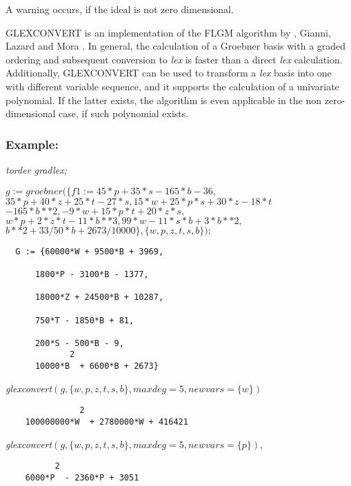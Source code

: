 A warning occurs, if the ideal is not zero dimensional.

GLEXCONVERT is an implementation of the FLGM algorithm by
, {\sc Gianni}, {\sc Lazard} and {\sc
Mora} \cite{FGLM}. In general, the calculation of a Groebner basis
with a graded ordering and subsequent conversion to {\it lex} is
faster than a direct {\it lex} calculation. Additionally, GLEXCONVERT
can be used to transform a {\it lex} basis into one with different
variable sequence, and it supports the calculation of a univariate
polynomial. If the latter exists, the algorithm is even applicable in
the non zero-dimensional case, if such polynomial exists.

\subsubsection*{Example:}
{\it torder gradlex;}

$ g  :=  groebner  (\{ f1 := 45*p + 35*s -165*b -36,$ \\
\hspace*{+1cm} $35*p + 40*z + 25*t - 27*s, 15*w + 25*p*s +30*z -18*t $ \\
\hspace*{+1cm} $-165*b**2, -9*w + 15*p*t  + 20*z*s, $ \\
\hspace*{+1cm} $ w*p + 2*z*t - 11*b**3, 99*w - 11*s*b +3*b**2, $ \\
\hspace*{+1cm} $ b**2 + 33/50*b + 2673/10000\}, \{w,p,z,t,s,b\});$

\begin{verbatim}
  G := {60000*W + 9500*B + 3969,

      1800*P - 3100*B - 1377,

      18000*Z + 24500*B + 10287,

      750*T - 1850*B + 81,

      200*S - 500*B - 9,
             2
      10000*B  + 6600*B + 2673}
\end{verbatim}

{\it
glexconvert}$\left(g,\{w,p,z,t,s,b\},maxdeg=5,newvars=\{w\}\right)$
\begin{verbatim}
               2
    100000000*W  + 2780000*W + 416421
\end{verbatim}

{\it glexconvert}$\left(g,\{w,p,z,t,s,b\},maxdeg=5,
newvars=\{p\}\right),$
\begin{verbatim}
          2
    6000*P  - 2360*P + 3051

\end{verbatim}

